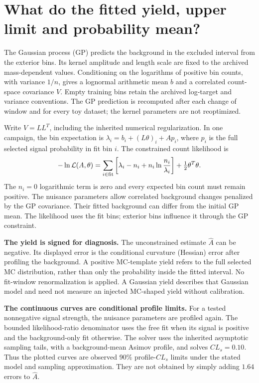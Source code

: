 \documentclass[11pt]{article}
\newcommand{\Ah}{\widehat A}\newcommand{\sh}{\widehat\sigma}
\begin{document}
\clearpage\section*{What do the fitted yield, upper limit and probability mean?}

The Gaussian process (GP) predicts the background in the excluded interval from the exterior bins. Its kernel amplitude and length scale are fixed to the archived mass-dependent values. Conditioning on the logarithms of positive bin counts, with variance $1/n$, gives a lognormal arithmetic mean $b$ and a correlated count-space covariance $V$. Empty training bins retain the archived log-target and variance conventions. The GP prediction is recomputed after each change of window and for every toy dataset; the kernel parameters are not reoptimized.

Write $V=LL^T$, including the inherited numerical regularization. In one campaign, the bin expectation is $\lambda_i=b_i+(L\theta)_i+A p_i$, where $p_i$ is the full selected signal probability in fit bin $i$. The constrained count likelihood is
\[
 -\ln\mathcal L(A,\theta)
 =\sum_{i\in{\rm fit}}\left[\lambda_i-n_i+n_i\ln\frac{n_i}{\lambda_i}\right]
  +\tfrac12\theta^T\theta .
\]
The $n_i=0$ logarithmic term is zero and every expected bin count must remain positive. The nuisance parameters allow correlated background changes penalized by the GP covariance. Their fitted background can differ from the initial GP mean. The likelihood uses the fit bins; exterior bins influence it through the GP constraint.

\textbf{The yield is signed for diagnosis.} The unconstrained estimate $\Ah$ can be negative. Its displayed error is the conditional curvature (Hessian) error after profiling the background. A positive MC-template yield refers to the full selected MC distribution, rather than only the probability inside the fitted interval. No fit-window renormalization is applied. A Gaussian yield describes that Gaussian model and need not measure an injected MC-shaped yield without calibration.

\textbf{The continuous curves are conditional profile limits.} For a tested nonnegative signal strength, the nuisance parameters are profiled again. The bounded likelihood-ratio denominator uses the free fit when its signal is positive and the background-only fit otherwise. The solver uses the inherited asymptotic sampling tails, with a background-mean Asimov profile, and solves $CL_s=0.10$. Thus the plotted curves are observed 90\% profile-$CL_s$ limits under the stated model and sampling approximation. They are not obtained by simply adding $1.64$ errors to $\Ah$.
\end{document}
